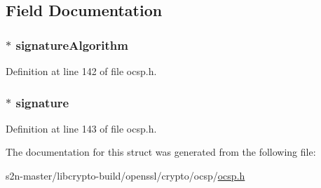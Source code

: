 \subsection{Field Documentation}
\subsubsection[{\texorpdfstring{signature\+Algorithm}{signatureAlgorithm}}]{ $\ast$ signature\+Algorithm}\hypertarget{structocsp__signature__st_a62f215a12d6f9dce51fbfe57bf275fcc}{}\label{structocsp__signature__st_a62f215a12d6f9dce51fbfe57bf275fcc}


Definition at line 142 of file ocsp.\+h.

\subsubsection[{\texorpdfstring{signature}{signature}}]{ $\ast$ signature}\hypertarget{structocsp__signature__st_a0ded22400c40848a864a98aeb7946f1a}{}\label{structocsp__signature__st_a0ded22400c40848a864a98aeb7946f1a}


Definition at line 143 of file ocsp.\+h.



The documentation for this struct was generated from the following file\+:\begin{DoxyCompactItemize}
\item 
s2n-\/master/libcrypto-\/build/openssl/crypto/ocsp/\hyperlink{crypto_2ocsp_2ocsp_8h}{ocsp.\+h}\end{DoxyCompactItemize}
